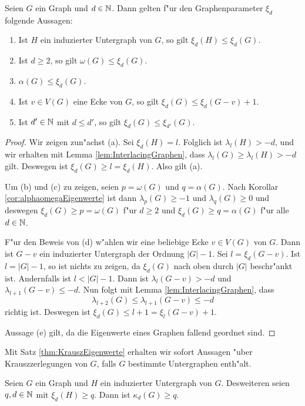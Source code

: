 \begin{lemma}
  Seien $G$ ein Graph und $d\in {\mathbb{N}}$. Dann gelten f"ur den Graphenparameter $\xi_d$ folgende Aussagen:
  \begin{enumerate}[label={\rm(\alph*)}]
    \item Ist $H$ ein induzierter Untergraph von $G$, so gilt $\xi_{d}(H) \leq \xi_{d}(G)$.
    \item Ist $d\geq 2$, so gilt $\omega(G) \leq \xi_{d}(G)$.
    \item $\alpha(G) \leq \xi_{d}(G)$. 
    \item Ist $v\in V(G)$ eine Ecke von $G$, so gilt $\xi_{d}(G) \leq \xi_{d}(G-v) +1$.
    \item Ist $d'\in{\mathbb{N}}$ mit $d \leq d'$, so gilt $\xi_{d}(G) \leq \xi_{d'}(G)$.
  \end{enumerate}
  \label{lem:xieigenschaften}
\end{lemma}

\begin{proof}
  Wir zeigen zun"achst (a). Sei $\xi_{d}(H) = l$. Folglich ist $\lambda_{l}(H) > -d$, und wir erhalten mit Lemma \ref{lem:InterlacingGraphen}, dass $\lambda_{l}(G) \geq \lambda_{l}(H) > -d$ gilt. Deswegen ist $\xi_{d}(G) \geq l = \xi_{d}(H)$. Also gilt (a).

  Um (b) und (c) zu zeigen, seien $p = \omega(G)$ und $q=\alpha(G)$. Nach Korollar \ref{cor:alphaomegaEigenwerte} ist dann $\lambda_{p}(G) \geq -1$ und $\lambda_q(G) \geq 0$ und deswegen $\xi_{d}(G) \geq p = \omega(G)$ f"ur $d \geq 2$ und $\xi_{d}(G) \geq q = \alpha(G)$ f"ur alle $d \in {\mathbb{N}}$. 

  F"ur den Beweis von (d) w"ahlen wir eine beliebige Ecke $v\in V(G)$ von $G$. Dann ist $G-v$ ein induzierter Untergraph der Ordnung $|G|-1$. Sei $l=\xi_{d}(G-v)$. Ist $l= |G|-1$, so ist nichts zu zeigen, da $\xi_d(G)$ nach oben durch $|G|$ beschr"ankt ist. Andernfalls ist $l< |G| -1$. 
  Dann ist $\lambda_{l}(G-v) > -d$ und $\lambda_{l+1}(G-v) \leq -d$. Nun folgt mit Lemma \ref{lem:InterlacingGraphen}, dass $$\lambda_{l+2}(G) \leq \lambda_{l+1}(G-v) \leq -d$$ richtig ist. Deswegen ist $\xi_{d}(G) \leq l+1 = \xi_{l}(G-v) +1$. 

  Aussage (e) gilt, da die Eigenwerte eines Graphen fallend geordnet sind.
\end{proof}

Mit Satz \ref{thm:KrauszEigenwerte} erhalten wir sofort Aussagen "uber Krauszzerlegungen von $G$, falls $G$ bestimmte Untergraphen enth"alt.
\begin{corollary}
  \label{cor:Korollar1}
  Seien $G$ ein Graph und $H$ ein induzierter Untergraph von $G$. Desweiteren seien $q,d \in {\mathbb{N}}$ mit $\xi_{d}(H) \geq q$. Dann ist $\kappa_{d}(G) \geq q$.
\end{corollary}


